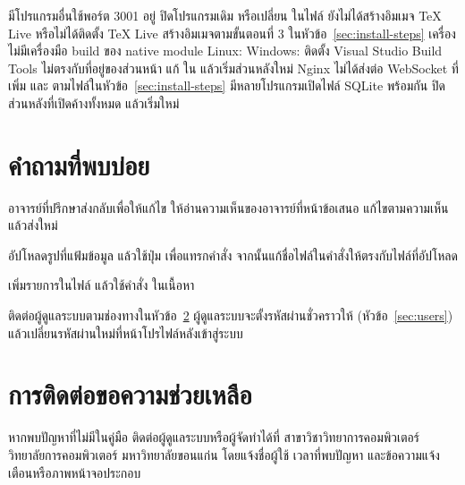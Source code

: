 \begin{troubleshooting}
        {มีโปรแกรมอื่นใช้พอร์ต 3001 อยู่}
        {ปิดโปรแกรมเดิม หรือเปลี่ยน  ในไฟล์ }
        {ยังไม่ได้สร้างอิมเมจ TeX Live หรือไม่ได้ติดตั้ง TeX Live}
        {สร้างอิมเมจตามขั้นตอนที่ 3 ในหัวข้อ~\ref{sec:install-steps}}
        {เครื่องไม่มีเครื่องมือ build ของ native module}
        {Linux:  \newline Windows: ติดตั้ง Visual Studio Build Tools}
        { ไม่ตรงกับที่อยู่ของส่วนหน้า}
        {แก้  ใน  แล้วเริ่มส่วนหลังใหม่}
        {Nginx ไม่ได้ส่งต่อ WebSocket ที่ }
        {เพิ่ม  และ  ตามไฟล์ในหัวข้อ~\ref{sec:install-steps}}
        {มีหลายโปรแกรมเปิดไฟล์ SQLite พร้อมกัน}
        {ปิดส่วนหลังที่เปิดค้างทั้งหมด แล้วเริ่มใหม่}
\end{troubleshooting}

\section{คำถามที่พบบ่อย}

\begin{faq}
อาจารย์ที่ปรึกษาส่งกลับเพื่อให้แก้ไข ให้อ่านความเห็นของอาจารย์ที่หน้าข้อเสนอ แก้ไขตามความเห็น แล้วส่งใหม่

อัปโหลดรูปที่แฟ้มข้อมูล แล้วใช้ปุ่ม  เพื่อแทรกคำสั่ง 
จากนั้นแก้ชื่อไฟล์ในคำสั่งให้ตรงกับไฟล์ที่อัปโหลด

เพิ่มรายการในไฟล์  แล้วใช้คำสั่ง  ในเนื้อหา

ติดต่อผู้ดูแลระบบตามช่องทางในหัวข้อ~\ref{sec:contact} ผู้ดูแลระบบจะตั้งรหัสผ่านชั่วคราวให้
(หัวข้อ~\ref{sec:users}) แล้วเปลี่ยนรหัสผ่านใหม่ที่หน้าโปรไฟล์หลังเข้าสู่ระบบ
\end{faq}

\section{การติดต่อขอความช่วยเหลือ}
\label{sec:contact}

หากพบปัญหาที่ไม่มีในคู่มือ ติดต่อผู้ดูแลระบบหรือผู้จัดทำได้ที่
สาขาวิชาวิทยาการคอมพิวเตอร์ วิทยาลัยการคอมพิวเตอร์ มหาวิทยาลัยขอนแก่น
โดยแจ้งชื่อผู้ใช้ เวลาที่พบปัญหา และข้อความแจ้งเตือนหรือภาพหน้าจอประกอบ
